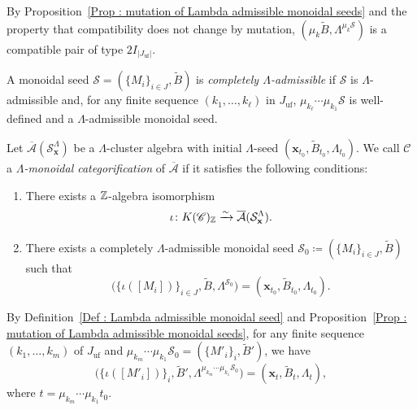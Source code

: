 By Proposition~\ref{Prop : mutation of Lambda admissible monoidal seeds}
and the property that compatibility does not change by mutation,
$(\mu_k\widetilde{B}, \Lambda^{\mu_k\mathscr{S}})$
is a compatible pair of type $2I_{|J_{\mathrm{uf}}|}$.

\begin{Def}
\label{Def : completely Lambda admissible monoidal seed}
A monoidal seed
$\mathscr{S} = (\{M_i\}_{i \in J}, \widetilde{B})$
is \emph{completely $\Lambda$-admissible}
if $\mathscr{S}$ is $\Lambda$-admissible and,
for any finite sequence $(k_1, \ldots, k_\ell)$ in $J_{\mathrm{uf}}$,
$\mu_{k_\ell}\cdots\mu_{k_1}\mathscr{S}$
is well-defined and a $\Lambda$-admissible monoidal seed.
\end{Def}

\begin{Def}
\label{Def : Lambda monoidal categorification}
Let $\overline{\mathcal{A}}(\mathcal{S}_{\mathbf{x}}^{\Lambda})$
be a $\Lambda$-cluster algebra with initial $\Lambda$-seed
$(\mathbf{x}_{t_0}, \widetilde{B}_{t_0}, \Lambda_{t_0})$.
We call $\mathscr{C}$ a \emph{$\Lambda$-monoidal categorification}
of $\overline{\mathcal{A}}$ if it satisfies the following conditions:
\begin{enumerate}
    \item[(1)] There exists a $\mathbb{Z}$-algebra isomorphism
    \[
    \iota \colon K(\mathscr{C})_{\mathbb{Z}}
    \xrightarrow{\sim}
    \overline{\mathcal{A}}(\mathcal{S}_{\mathbf{x}}^{\Lambda}).
    \]
    \item[(2)] There exists a completely $\Lambda$-admissible
    monoidal seed
    $\mathscr{S}_0 \coloneq (\{M_i\}_{i \in J}, \widetilde{B})$
    such that
    \[
    \bigl(\{\iota([M_i])\}_{i \in J},
    \widetilde{B}, \Lambda^{\mathscr{S}_0}\bigr)
    = (\mathbf{x}_{t_0}, \widetilde{B}_{t_0}, \Lambda_{t_0}).
    \]
\end{enumerate}
\end{Def}

By Definition~\ref{Def : Lambda admissible monoidal seed}
and Proposition~\ref{Prop : mutation of Lambda admissible monoidal seeds},
for any finite sequence $(k_1, \ldots, k_m)$ of $J_{\mathrm{uf}}$ and
$\mu_{k_m}\cdots\mu_{k_1}\mathscr{S}_0
= (\{M'_i\}_i, \widetilde{B}')$, we have
\[
\bigl(\{\iota([M'_i])\}_i, \widetilde{B}',
\Lambda^{\mu_{k_m}\cdots\mu_{k_1}\mathscr{S}_0}\bigr)
= (\mathbf{x}_t, \widetilde{B}_t, \Lambda_t),
\]
where $t = \mu_{k_m}\cdots\mu_{k_1}t_0$. 

